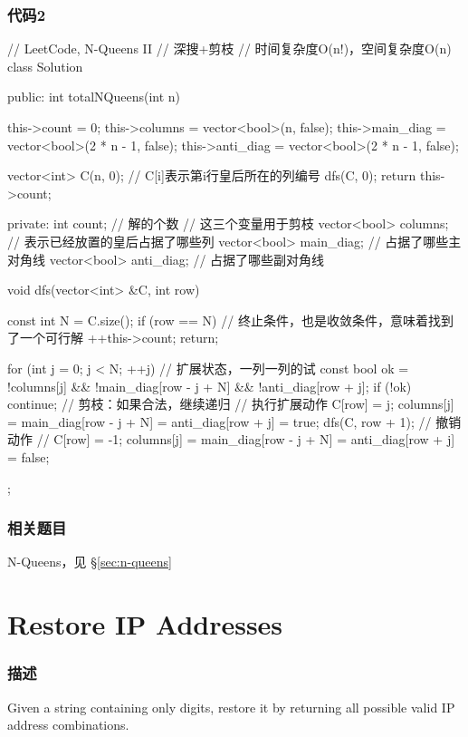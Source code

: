 \subsubsection{代码2}
\begin{Code}
// LeetCode, N-Queens II
// 深搜+剪枝
// 时间复杂度O(n!)，空间复杂度O(n)
class Solution {
public:
    int totalNQueens(int n) {
        this->count = 0;
        this->columns = vector<bool>(n, false);
        this->main_diag = vector<bool>(2 * n - 1, false);
        this->anti_diag = vector<bool>(2 * n - 1, false);

        vector<int> C(n, 0);  // C[i]表示第i行皇后所在的列编号
        dfs(C, 0);
        return this->count;
    }
private:
    int count; // 解的个数
    // 这三个变量用于剪枝
    vector<bool> columns;  // 表示已经放置的皇后占据了哪些列
    vector<bool> main_diag;  // 占据了哪些主对角线
    vector<bool> anti_diag;  // 占据了哪些副对角线

    void dfs(vector<int> &C, int row) {
        const int N = C.size();
        if (row == N) { // 终止条件，也是收敛条件，意味着找到了一个可行解
            ++this->count;
            return;
        }

        for (int j = 0; j < N; ++j) {  // 扩展状态，一列一列的试
            const bool ok = !columns[j] &&
                    !main_diag[row - j + N] &&
                    !anti_diag[row + j];
            if (!ok) continue;  // 剪枝：如果合法，继续递归
            // 执行扩展动作
            C[row] = j;
            columns[j] = main_diag[row - j + N] =
                    anti_diag[row + j] = true;
            dfs(C, row + 1);
            // 撤销动作
            // C[row] = -1;
            columns[j] = main_diag[row - j + N] =
                    anti_diag[row + j] = false;
        }
    }
};
\end{Code}


\subsubsection{相关题目}
\begindot
\item N-Queens，见 \S \ref{sec:n-queens}
\myenddot


\section{Restore IP Addresses} %
\label{sec:restore-ip-addresses}


\subsubsection{描述}
Given a string containing only digits, restore it by returning all possible valid IP address combinations.

